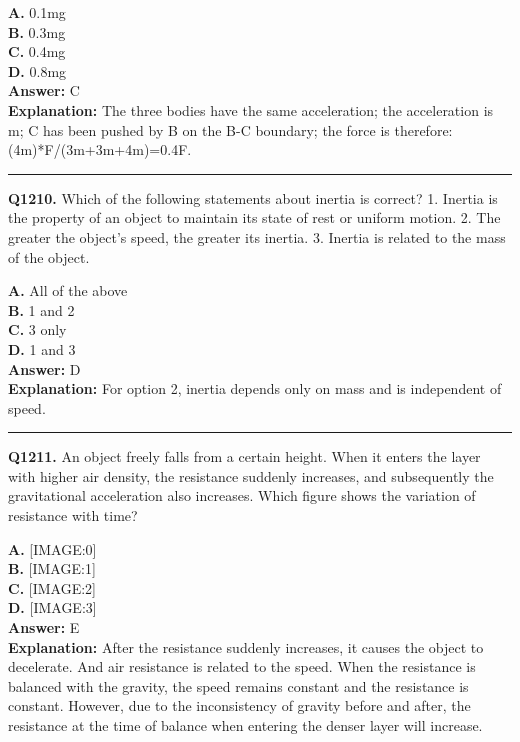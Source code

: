 \documentclass[12pt]{article}
\begin{document}
\textbf{A.} 0.1mg \\
\textbf{B.} 0.3mg \\
\textbf{C.} 0.4mg \\
\textbf{D.} 0.8mg \\

\textbf{Answer:} C \\
\textbf{Explanation:} The three bodies have the same acceleration; the acceleration is m;
C has been pushed by B on the B-C boundary; the force is therefore: (4m)*F/(3m+3m+4m)=0.4F.

\hrule
\vspace{1em}


\noindent
\textbf{Q1210.} Which of the following statements about inertia is correct?
1.
Inertia is the property of an object to maintain its state of rest or uniform motion.
2.
The greater the object's speed, the greater its inertia.
3.
Inertia is related to the mass of the object.



\textbf{A.} All of the above \\
\textbf{B.} 1 and 2 \\
\textbf{C.} 3 only \\
\textbf{D.} 1 and 3 \\

\textbf{Answer:} D \\
\textbf{Explanation:} For option 2, inertia depends only on mass and is independent of speed.

\hrule
\vspace{1em}


\noindent
\textbf{Q1211.} An object freely falls from a certain height. When it enters the layer with higher air density, the resistance suddenly increases, and subsequently the gravitational acceleration also increases. Which figure shows the variation of resistance with time?



\textbf{A.} [IMAGE:0] \\
\textbf{B.} [IMAGE:1] \\
\textbf{C.} [IMAGE:2] \\
\textbf{D.} [IMAGE:3] \\

\textbf{Answer:} E \\
\textbf{Explanation:} After the resistance suddenly increases, it causes the object to decelerate. And air resistance is related to the speed. When the resistance is balanced with the gravity, the speed remains constant and the resistance is constant. However, due to the inconsistency of gravity before and after, the resistance at the time of balance when entering the denser layer will increase.
\end{document}
